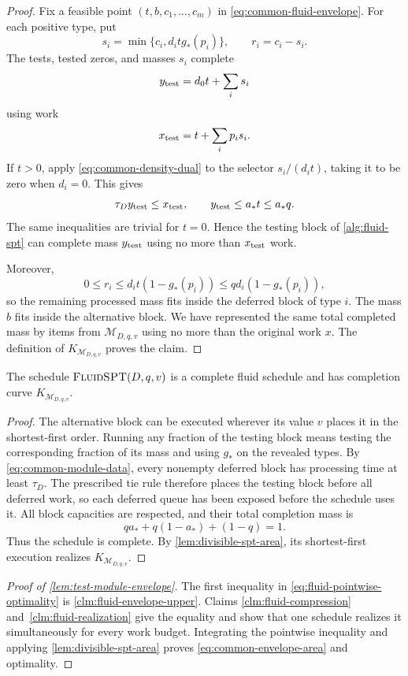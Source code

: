\begin{proof}
Fix a feasible point $(t,b,c_1,\ldots,c_m)$ in
\cref{eq:common-fluid-envelope}.  For each positive type, put
\[
 s_i=\min\{c_i,d_itg_*(p_i)\},
 \qquad r_i=c_i-s_i.
\]
The tests, tested zeros, and masses $s_i$ complete
\[
 y_{\rm test}=d_0t+\sum_i s_i
\]
using work
\[
 x_{\rm test}=t+\sum_i p_is_i.
\]
If $t>0$, apply \cref{eq:common-density-dual} to the selector
$s_i/(d_it)$, taking it to be zero when $d_i=0$.  This gives
\[
 \tau_Dy_{\rm test}\le x_{\rm test},
 \qquad y_{\rm test}\le a_*t\le a_*q.
\]
The same inequalities are trivial for $t=0$.  Hence the testing block of
\cref{alg:fluid-spt} can complete mass $y_{\rm test}$ using no more than
$x_{\rm test}$ work.

Moreover,
\[
 0\le r_i\le d_it(1-g_*(p_i))
        \le qd_i(1-g_*(p_i)),
\]
so the remaining processed mass fits inside the deferred block of type $i$.
The mass $b$ fits inside the alternative block.  We have represented the
same total completed mass by items from $\mathcal M_{D,q,v}$ using no more
than the original work $x$.  The definition of
$K_{\mathcal M_{D,q,v}}$ proves the claim.
\end{proof}

\begin{claim}
\label{clm:fluid-realization}
The schedule $\textnormal{\textsc{FluidSPT}}(D,q,v)$ is a complete fluid
schedule and has completion curve $K_{\mathcal M_{D,q,v}}$.
\end{claim}

\begin{proof}
The alternative block can be executed wherever its value $v$ places it in
the shortest-first order.  Running any fraction of the testing block means
testing the corresponding fraction of its mass and using $g_*$ on the
revealed types.  By \cref{eq:common-module-data}, every nonempty deferred
block has processing time at least $\tau_D$.  The prescribed tie rule
therefore places the testing block before all deferred work, so each deferred
queue has been exposed before the schedule uses it.  All block capacities
are respected, and their total completion mass is
\[
 qa_*+q(1-a_*)+(1-q)=1.
\]
Thus the schedule is complete.  By
\cref{lem:divisible-spt-area}, its shortest-first execution realizes
$K_{\mathcal M_{D,q,v}}$.
\end{proof}

\begin{proof}[Proof of \cref{lem:test-module-envelope}]
The first inequality in \cref{eq:fluid-pointwise-optimality} is
\cref{clm:fluid-envelope-upper}.  Claims
\ref{clm:fluid-compression} and~\ref{clm:fluid-realization} give the equality
and show that one schedule realizes it simultaneously for every work budget.
Integrating the pointwise inequality and applying
\cref{lem:divisible-spt-area} proves
\cref{eq:common-envelope-area} and optimality.
\end{proof}

